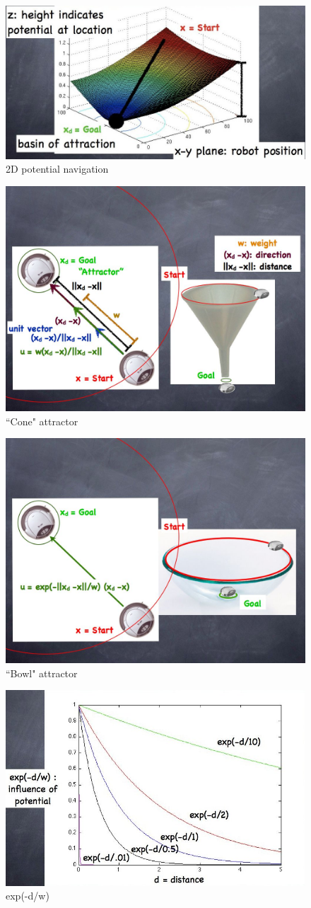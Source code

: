 \begin{figure}[!h]
\centering
\includegraphics[width=0.6\columnwidth]{figures/7_potential2.jpg}
\caption{2D potential navigation}
\end{figure}

\begin{figure}[!h]
\centering
\includegraphics[width=0.6\columnwidth]{figures/7_potential3.jpg}
\caption{``Cone" attractor}
\end{figure}

\begin{figure}[!h]
\centering
\includegraphics[width=0.6\columnwidth]{figures/7_potential4.jpg}
\caption{``Bowl" attractor}
\end{figure}

\begin{figure}[!h]
\centering
\includegraphics[width=0.6\columnwidth]{figures/7_potential5.jpg}
\caption{exp(-d/w)}
\end{figure}

